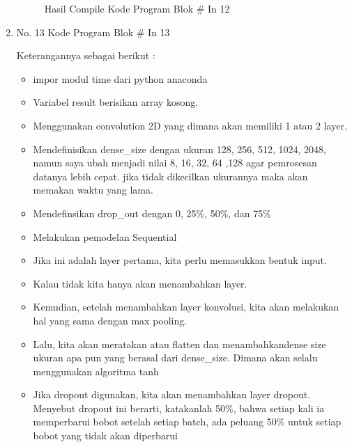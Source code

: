 \begin{enumerate}
\begin{figure}[!htbp]
      \caption{Hasil Compile Kode Program Blok \# In 12}
      \label{refer23}
\end{figure}

\item No. 13 Kode Program Blok \# In 13
\par 
Keterangannya sebagai berikut :
\begin{itemize}
\item impor modul time dari python anaconda
\item Variabel result berisikan array kosong.
\item Menggunakan convolution 2D yang dimana akan memiliki 1 atau 2 layer.
\item Mendefinisikan dense\_size dengan ukuran 128, 256, 512, 1024, 2048, namun saya ubah menjadi nilai 8, 16, 32, 64 ,128 agar pemrosesan datanya lebih cepat. jika tidak dikecilkan ukurannya maka akan memakan waktu yang lama.
\item Mendefinsikan drop\_out dengan 0, 25\%, 50\%, dan 75\%
\item Melakukan pemodelan Sequential
\item Jika ini adalah layer pertama, kita perlu memasukkan bentuk input.
\item Kalau tidak kita hanya akan menambahkan layer.
\item Kemudian, setelah menambahkan layer konvolusi, kita akan melakukan hal yang sama dengan max pooling.
\item  Lalu, kita akan meratakan atau flatten dan menambahkandense size ukuran apa pun yang berasal dari dense\_size. Dimana akan selalu menggunakan algoritma tanh
\item Jika dropout digunakan, kita akan menambahkan layer dropout. Menyebut dropout ini berarti, katakanlah 50\%, bahwa setiap kali ia memperbarui bobot setelah setiap batch, ada peluang 50\% untuk setiap bobot yang tidak akan diperbarui

\end{itemize}
\end{enumerate}
